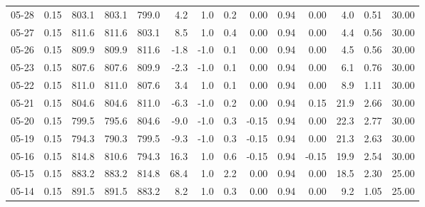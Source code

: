 \begin{threeparttable}
{\begin{tabular}{lrrrrrrrrrrrrr}
  05-28 &     0.15 & 803.1 & 803.1 & 799.0 &        4.2 &                      1.0 &                 0.2 &       0.00 &      0.94 &           0.00 &              4.0 &            0.51 &                  30.00 \\
  05-27 &     0.15 & 811.6 & 811.6 & 803.1 &        8.5 &                      1.0 &                 0.4 &       0.00 &      0.94 &           0.00 &              4.4 &            0.56 &                  30.00 \\
  05-26 &     0.15 & 809.9 & 809.9 & 811.6 &       -1.8 &                     -1.0 &                 0.1 &       0.00 &      0.94 &           0.00 &              4.5 &            0.56 &                  30.00 \\
  05-23 &     0.15 & 807.6 & 807.6 & 809.9 &       -2.3 &                     -1.0 &                 0.1 &       0.00 &      0.94 &           0.00 &              6.1 &            0.76 &                  30.00 \\
  05-22 &     0.15 & 811.0 & 811.0 & 807.6 &        3.4 &                      1.0 &                 0.1 &       0.00 &      0.94 &           0.00 &              8.9 &            1.11 &                  30.00 \\
  05-21 &     0.15 & 804.6 & 804.6 & 811.0 &       -6.3 &                     -1.0 &                 0.2 &       0.00 &      0.94 &           0.15 &             21.9 &            2.66 &                  30.00 \\
  05-20 &     0.15 & 799.5 & 795.6 & 804.6 &       -9.0 &                     -1.0 &                 0.3 &      -0.15 &      0.94 &           0.00 &             22.3 &            2.77 &                  30.00 \\
  05-19 &     0.15 & 794.3 & 790.3 & 799.5 &       -9.3 &                     -1.0 &                 0.3 &      -0.15 &      0.94 &           0.00 &             21.3 &            2.63 &                  30.00 \\
  05-16 &     0.15 & 814.8 & 810.6 & 794.3 &       16.3 &                      1.0 &                 0.6 &      -0.15 &      0.94 &          -0.15 &             19.9 &            2.54 &                  30.00 \\
  05-15 &     0.15 & 883.2 & 883.2 & 814.8 &       68.4 &                      1.0 &                 2.2 &       0.00 &      0.94 &           0.00 &             18.5 &            2.30 &                  25.00 \\
  05-14 &     0.15 & 891.5 & 891.5 & 883.2 &        8.2 &                      1.0 &                 0.3 &       0.00 &      0.94 &           0.00 &              9.2 &            1.05 &                  25.00 \\

\end{tabular}}
\end{threeparttable}
